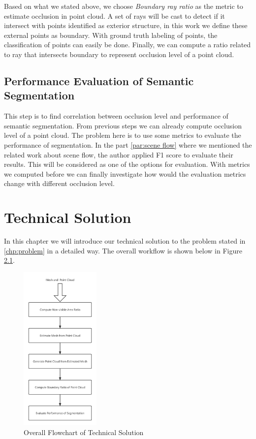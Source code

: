 \documentclass[11pt, a4paper,oneside,chapterprefix=false]{scrbook}
\begin{document}
Based on what we stated above, we choose \textit{Boundary ray ratio} as the metric to estimate occlusion in point cloud. A set of rays will be cast to detect if it intersect with points identified as exterior structure, in this work we define these external points as boundary. With ground truth labeling of points, the classification of points can easily be done. Finally, we can compute a ratio related to ray that intersects boundary to represent occlusion level of a point cloud. 

\section{Performance Evaluation of Semantic Segmentation} \label{sec:performance evaluation}

This step is to find correlation between occlusion level and performance of semantic segmentation. From previous steps we can already compute occlusion level of a point cloud. The problem here is to use some metrics to evaluate the performance of segmentation. In the part \ref{par:scene flow} where we mentioned the related work about scene flow, the author applied F1 score to evaluate their results. This will be considered as one of the options for evaluation. With metrics we computed before we can finally investigate how would the evaluation metrics change with different occlusion level. 

\chapter{Technical Solution} \label{chp:solution}

In this chapter we will introduce our technical solution to the problem stated in \ref{chp:problem} in a detailed way. The overall workflow is shown below in Figure \ref{fig:overall flowchart of technical solution}.

\begin{figure}[H]
    \centering
    \includegraphics*[width=0.35\textwidth]{figures/technical solution flowchart.png}
    \caption{Overall Flowchart of Technical Solution}
    \label{fig:overall flowchart of technical solution}
\end{figure}
\end{document}
